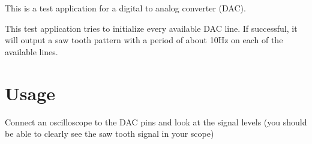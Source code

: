 This is a test application for a digital to analog converter (D\+AC).

This test application tries to initialize every available D\+AC line. If successful, it will output a saw tooth pattern with a period of about 10\+Hz on each of the available lines.

\section*{Usage }

Connect an oscilloscope to the D\+AC pins and look at the signal levels (you should be able to clearly see the saw tooth signal in your scope) 